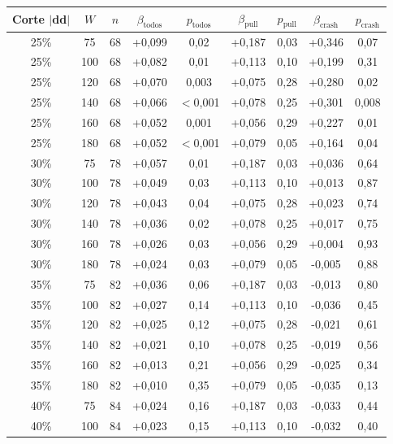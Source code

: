 \begin{longtable}{ccccccccc}
\toprule
Corte $|$dd$|$ & $W$ & $n$ & $\beta_{\text{todos}}$ & $p_{\text{todos}}$ & $\beta_{\text{pull}}$ & $p_{\text{pull}}$ & $\beta_{\text{crash}}$ & $p_{\text{crash}}$ \\
\midrule
25\% & 75 & 68 & +0{,}099 & 0{,}02 & +0{,}187 & 0{,}03 & +0{,}346 & 0{,}07 \\
25\% & 100 & 68 & +0{,}082 & 0{,}01 & +0{,}113 & 0{,}10 & +0{,}199 & 0{,}31 \\
25\% & 120 & 68 & +0{,}070 & 0{,}003 & +0{,}075 & 0{,}28 & +0{,}280 & 0{,}02 \\
25\% & 140 & 68 & +0{,}066 & $<$0{,}001 & +0{,}078 & 0{,}25 & +0{,}301 & 0{,}008 \\
25\% & 160 & 68 & +0{,}052 & 0{,}001 & +0{,}056 & 0{,}29 & +0{,}227 & 0{,}01 \\
25\% & 180 & 68 & +0{,}052 & $<$0{,}001 & +0{,}079 & 0{,}05 & +0{,}164 & 0{,}04 \\
30\% & 75 & 78 & +0{,}057 & 0{,}01 & +0{,}187 & 0{,}03 & +0{,}036 & 0{,}64 \\
30\% & 100 & 78 & +0{,}049 & 0{,}03 & +0{,}113 & 0{,}10 & +0{,}013 & 0{,}87 \\
30\% & 120 & 78 & +0{,}043 & 0{,}04 & +0{,}075 & 0{,}28 & +0{,}023 & 0{,}74 \\
30\% & 140 & 78 & +0{,}036 & 0{,}02 & +0{,}078 & 0{,}25 & +0{,}017 & 0{,}75 \\
30\% & 160 & 78 & +0{,}026 & 0{,}03 & +0{,}056 & 0{,}29 & +0{,}004 & 0{,}93 \\
30\% & 180 & 78 & +0{,}024 & 0{,}03 & +0{,}079 & 0{,}05 & -0{,}005 & 0{,}88 \\
35\% & 75 & 82 & +0{,}036 & 0{,}06 & +0{,}187 & 0{,}03 & -0{,}013 & 0{,}80 \\
35\% & 100 & 82 & +0{,}027 & 0{,}14 & +0{,}113 & 0{,}10 & -0{,}036 & 0{,}45 \\
35\% & 120 & 82 & +0{,}025 & 0{,}12 & +0{,}075 & 0{,}28 & -0{,}021 & 0{,}61 \\
35\% & 140 & 82 & +0{,}021 & 0{,}10 & +0{,}078 & 0{,}25 & -0{,}019 & 0{,}56 \\
35\% & 160 & 82 & +0{,}013 & 0{,}21 & +0{,}056 & 0{,}29 & -0{,}025 & 0{,}34 \\
35\% & 180 & 82 & +0{,}010 & 0{,}35 & +0{,}079 & 0{,}05 & -0{,}035 & 0{,}13 \\
40\% & 75 & 84 & +0{,}024 & 0{,}16 & +0{,}187 & 0{,}03 & -0{,}033 & 0{,}44 \\
40\% & 100 & 84 & +0{,}023 & 0{,}15 & +0{,}113 & 0{,}10 & -0{,}032 & 0{,}40 \\

\end{longtable}
